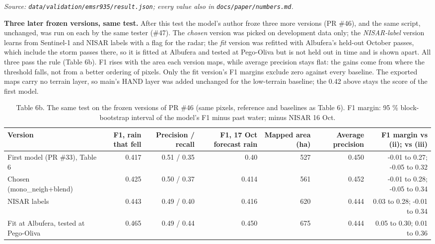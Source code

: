 \documentclass[10pt,twocolumn]{article}
\begin{document}
\emph{Source: \texttt{data/\allowbreak{}validation/\allowbreak{}emsr935/\allowbreak{}result.\allowbreak{}json}; every value also in \texttt{docs/\allowbreak{}paper/\allowbreak{}numbers.\allowbreak{}md}.}

\textbf{Three later frozen versions, same test.} After this test the model's author froze three more versions (PR \#46), and the same script, unchanged, was run on each by the same tester (\#47). The \emph{chosen} version was picked on development data only; the \emph{NISAR-label} version learns from Sentinel-1 and NISAR labels with a flag for the radar; the \emph{fit} version was refitted with Albufera's held-out October passes, which include the storm passes there, so it is fitted at Albufera and tested at Pego-Oliva but is not held out in time and is shown apart. All three pass the rule (Table 6b). F1 rises with the area each version maps, while average precision stays flat: the gains come from where the threshold falls, not from a better ordering of pixels. Only the fit version's F1 margins exclude zero against every baseline. The exported maps carry no terrain layer, so main's HAND layer was added unchanged for the low-terrain baseline; the 0.42 above stays the score of the first model.

\begin{table}[tbp]
\centering
\caption{Table 6b. The same test on the frozen versions of PR \#46 (same pixels, reference and baselines as Table 6). F1 margin: 95 \% block-bootstrap interval of the model's F1 minus past water; minus NISAR 16 Oct.}
\footnotesize
\begin{tabularx}{\textwidth}{Lrrrrrr}
\toprule
\textbf{Version} & \textbf{F1, rain that fell} & \textbf{Precision / recall} & \textbf{F1, 17 Oct forecast rain} & \textbf{Mapped area (ha)} & \textbf{Average precision} & \textbf{F1 margin vs (ii); vs (iii)} \\
\midrule
{}First model (PR \#33), Table 6 & 0.417 & 0.51 / 0.35 & 0.40 & 527 & 0.450 & -0.01 to 0.27; -0.05 to 0.32 \\
{}Chosen (mono\_neigh+blend) & 0.425 & 0.50 / 0.37 & 0.414 & 561 & 0.452 & -0.01 to 0.28; -0.05 to 0.34 \\
{}NISAR labels & 0.443 & 0.49 / 0.40 & 0.416 & 620 & 0.444 & 0.03 to 0.28; -0.01 to 0.34 \\
{}Fit at Albufera, tested at Pego-Oliva & 0.465 & 0.49 / 0.44 & 0.450 & 675 & 0.444 & 0.05 to 0.30; 0.01 to 0.36 \\
\bottomrule
\end{tabularx}
\end{table}
\end{document}
